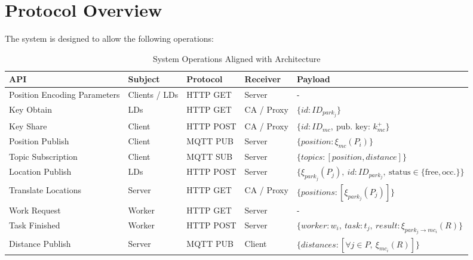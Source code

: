 
\section{Protocol Overview}
The system is designed to allow the following operations:

\begin{table}[h]
\renewcommand{\arraystretch}{1.3}
\small
\begin{tabularx}{\linewidth}{|l|X|X|X|p{4cm}|}
\hline
\textbf{API} & \textbf{Subject} & \textbf{Protocol} & \textbf{Receiver} & \textbf{Payload} \\ \hline

Position Encoding Parameters & Clients / LDs & HTTP GET & Server & - \\ \hline

Key Obtain & LDs & HTTP GET & CA / Proxy & $\{id: ID_{park_j}\}$ \\ \hline

Key Share & Client & HTTP POST & CA / Proxy & $\{id: ID_{mc},\ \text{pub. key: } k_{mc}^+\}$ \\ \hline

Position Publish & Client & MQTT PUB & Server & $\{position: \xi_{mc}(P_i)\}$ \\ \hline

Topic Subscription & Client & MQTT SUB & Server & $\{topics: [position, distance]\}$ \\ \hline

Location Publish & LDs & HTTP POST & Server & $\{\xi_{park_j}(P_j),\ id: ID_{park_j},\ \text{status} \in \{\text{free}, \text{occ.}\}\}$ \\ \hline

Translate Locations & Server & HTTP GET & CA / Proxy & $\{positions: [\xi_{park_j}(P_{j})]\}$ \\ \hline

Work Request & Worker & HTTP GET & Server & - \\ \hline

Task Finished & Worker & HTTP POST & Server & $\{worker: w_i,\ task: t_j,\ result: \xi_{park_j \to mc_i}(R)\}$ \\ \hline

Distance Publish & Server & MQTT PUB & Client & $\{distances: [\forall j \in P,\ \xi_{mc_i}(R)]\}$ \\ \hline

\end{tabularx}
\caption{System Operations Aligned with Architecture}
\label{table:system-operations}
\end{table}

